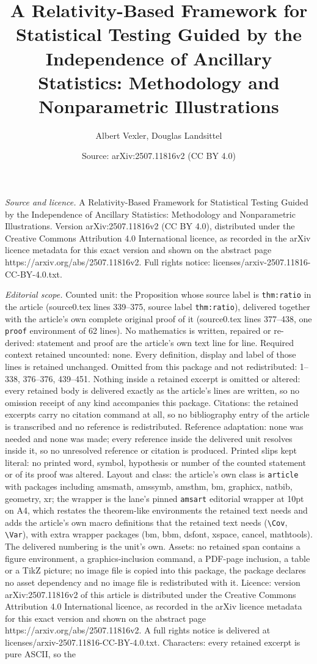 \documentclass[10pt,a4paper]{amsart}
\title[A Relativity-Based Framework for Statistical Testing Guided ]{A Relativity-Based Framework for Statistical Testing Guided by the Independence of Ancillary Statistics: Methodology and Nonparametric Illustrations}
\author{Albert Vexler, Douglas Landsittel}
\date{Source: arXiv:2507.11816v2 (CC BY 4.0)}
\begin{document}
\maketitle

\noindent\emph{Source and licence.} A Relativity-Based Framework for Statistical Testing Guided by the Independence of Ancillary Statistics: Methodology and Nonparametric Illustrations. Version arXiv:2507.11816v2 (CC BY 4.0), distributed under the Creative Commons Attribution 4.0 International licence, as recorded in the arXiv licence metadata for this exact version and shown on the abstract page https://arxiv.org/abs/2507.11816v2. Full rights notice: licenses/arxiv-2507.11816-CC-BY-4.0.txt.\par\smallskip

\noindent\textit{Editorial scope.} Counted unit: the Proposition whose source label is \texttt{thm:ratio} in the article (source0.tex lines 339--375, source label \texttt{thm:ratio}), delivered together with the article's own complete original proof of it (source0.tex lines 377--438, one \texttt{proof} environment of 62 lines). No mathematics is written, repaired or re-derived: statement and proof are the article's own text line for line. Required context retained uncounted: none. Every definition, display and label of those lines is retained unchanged. Omitted from this package and not redistributed: 1--338, 376--376, 439--451. Nothing inside a retained excerpt is omitted or altered: every retained body is delivered exactly as the article's lines are written, so no omission receipt of any kind accompanies this package. Citations: the retained excerpts carry no citation command at all, so no bibliography entry of the article is transcribed and no reference is redistributed. Reference adaptation: none was needed and none was made; every reference inside the delivered unit resolves inside it, so no unresolved reference or citation is produced. Printed slips kept literal: no printed word, symbol, hypothesis or number of the counted statement or of its proof was altered. Layout and class: the article's own class is \texttt{article} with packages including amsmath, amssymb, amsthm, bm, graphicx, natbib, geometry, xr; the wrapper is the lane's pinned \texttt{amsart} editorial wrapper at 10pt on A4, which restates the theorem-like environments the retained text needs and adds the article's own macro definitions that the retained text needs (\texttt{\textbackslash Cov}, \texttt{\textbackslash Var}), with extra wrapper packages (bm, bbm, dsfont, xspace, cancel, mathtools). The delivered numbering is the unit's own. Assets: no retained span contains a figure environment, a graphics-inclusion command, a PDF-page inclusion, a table or a TikZ picture; no image file is copied into this package, the package declares no asset dependency and no image file is redistributed with it. Licence: version arXiv:2507.11816v2 of this article is distributed under the Creative Commons Attribution 4.0 International licence, as recorded in the arXiv licence metadata for this exact version and shown on the abstract page https://arxiv.org/abs/2507.11816v2. A full rights notice is delivered at licenses/arxiv-2507.11816-CC-BY-4.0.txt. Characters: every retained excerpt is pure ASCII, so the 
\end{document}
